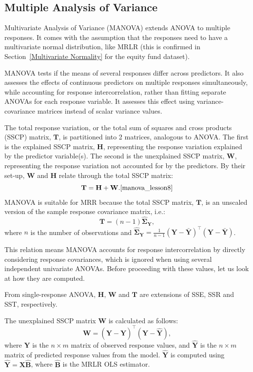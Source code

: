 \documentclass[11pt]{report} %
\begin{document}
\subsection{Multiple Analysis of Variance}
Multivariate Analysis of Variance (MANOVA) extends ANOVA to multiple responses. It comes with the assumption that the responses need to have a multivariate normal distribution, like MRLR (this is confirmed in Section~\ref{Multivariate Normality} for the equity fund dataset).\cite{iversen2004manova} 

MANOVA tests if the means of several responses differ across predictors. It also assesses the effects of continuous predictors on multiple responses simultaneously, while accounting for response intercorrelation, rather than fitting separate ANOVAs for each response variable.\cite{Newsom2024MANOVA} It assesses this effect using variance-covariance matrices instead of scalar variance values. 

The total response variation, or the total sum of squares and cross products (SSCP) matrix, $\mathbf{T}$, is partitioned into 2 matrices, analogous to ANOVA. The first is the explained SSCP matrix, \(\mathbf{H}\), representing the response variation explained by the predictor variable(s). The second is the unexplained SSCP matrix, \(\mathbf{W}\), representing the response variation not accounted for by the predictors. By their set-up, \(\mathbf{W}\) and \(\mathbf{H}\) relate through the total SSCP matrix: 
\[\mathbf{T} = \mathbf{H} + \mathbf{W}.\cite{manova_lesson8}\]
MANOVA is suitable for MRR because the total SSCP matrix, $\mathbf{T}$, is an unscaled version of the sample response covariance matrix, i.e.: 
\[
\mathbf{T} = (n-1)\mathbf{\hat{\Sigma}_Y},
\]
\noindent where $n$ is the number of observations and $\mathbf{\hat{\Sigma}_Y} = \frac{1}{n - 1} (\mathbf{Y} - \bar{\mathbf{Y}})^\top (\mathbf{Y} - \bar{\mathbf{Y}})$.

This relation means MANOVA accounts for response intercorrelation by directly considering response covariances, which is ignored when using several independent univariate ANOVAs. 
Before proceeding with these values, let us look at how they are computed.

From single-response ANOVA, $\mathbf{H}$, $\mathbf{W}$ and $\mathbf{T}$ are extensions of SSE, SSR and SST, respectively. 

\noindent The unexplained SSCP matrix \(\mathbf{W}\) is calculated as follows:
\[
\mathbf{W} = (\mathbf{Y} - \hat{\mathbf{Y}})^\top (\mathbf{Y} - \hat{\mathbf{Y}}),
\]
where \( \mathbf{Y} \) is the \( n \times m \) matrix of observed response values, and \( \hat{\mathbf{Y}} \) is the  \( n \times m \) matrix of predicted response values from the model. \( \hat{\mathbf{Y}} \) is computed using $\mathbf{\hat{Y}} = \mathbf{X\hat{B}}$, where $\mathbf{\hat{B}}$ is the MRLR OLS estimator.
\end{document}
